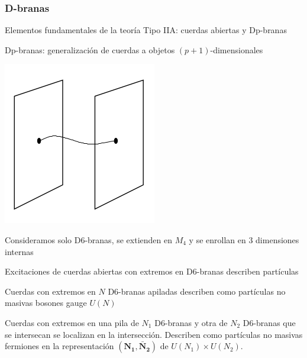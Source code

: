 \documentclass{beamer}
\begin{document}
\begin{frame}
  \frametitle{D-branas}
  \begin{itemize}
     \begin{minipage}{0.8\linewidth}
    \item Elementos fundamentales de la teoría Tipo IIA: cuerdas abiertas y Dp-branas
    \item Dp-branas: generalización de cuerdas a objetos $(p+1)$-dimensionales
     \end{minipage}%
     \begin{minipage}{.2\linewidth}
        \centering
      \includegraphics[width=\textwidth]{brane.png}
     \end{minipage}
    \item Consideramos solo D6-branas, se extienden en $M_4$ y se enrollan en 3 dimensiones internas
    \item Excitaciones de cuerdas abiertas con extremos en D6-branas describen partículas
    \item Cuerdas con extremos en $N$ D6-branas apiladas describen como partículas no masivas bosones gauge $U(N)$
    \item Cuerdas con extremos en una pila de $N_1$ D6-branas y otra de $N_2$ D6-branas que se intersecan
      se localizan en la intersección.
      Describen como partículas no masivas fermiones
      en la representación $(\mathbf{N_1,\bar N_2})$ de $U(N_1)\times U(N_2)$.
  \end{itemize}
\end{frame}
\end{document}

